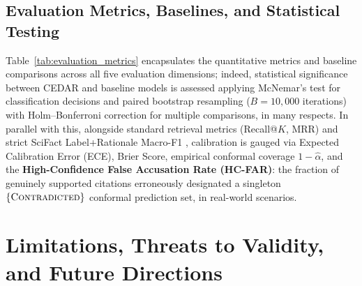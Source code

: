 \documentclass[journal]{IEEEtran}
\begin{document}
\subsection{Evaluation Metrics, Baselines, and Statistical Testing}
Table~\ref{tab:evaluation_metrics} encapsulates the quantitative metrics and baseline comparisons across all five evaluation dimensions; indeed, statistical significance between CEDAR and baseline models is assessed applying McNemar's test for classification decisions and paired bootstrap resampling ($B = 10{,}000$ iterations) with Holm--Bonferroni correction for multiple comparisons, in many respects. In parallel with this, alongside standard retrieval metrics (Recall@$K$, MRR) and strict SciFact Label+Rationale Macro-F1 \cite{wadden2020fact}, calibration is gauged via Expected Calibration Error (ECE), Brier Score, empirical conformal coverage $1-\hat{\alpha}$, and the \textbf{High-Confidence False Accusation Rate (HC-FAR)}: the fraction of genuinely supported citations erroneously designated a singleton $\{\textsc{Contradicted}\}$ conformal prediction set, in real-world scenarios.

\section{Limitations, Threats to Validity, and Future Directions}
\label{sec:limitations}
\end{document}
